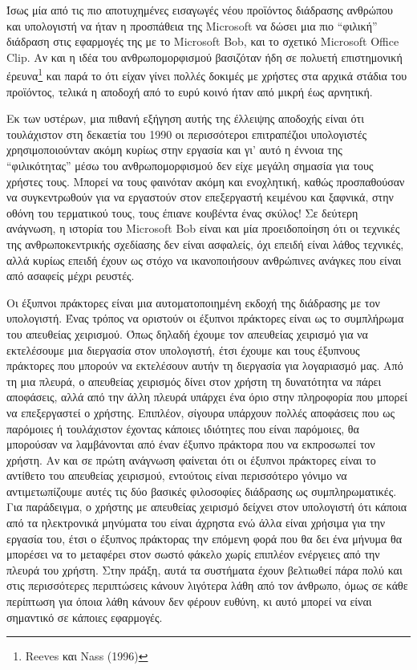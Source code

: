 \documentclass[
]{article}
\begin{document}
Ίσως μία από τις πιο αποτυχημένες εισαγωγές νέου προϊόντος διάδρασης
ανθρώπου και υπολογιστή να ήταν η προσπάθεια της Microsoft να δώσει μια
πιο ``φιλική'' διάδραση στις εφαρμογές της με το Microsoft Bob, και το
σχετικό Microsoft Office Clip. Αν και η ιδέα του ανθρωπομορφισμού
βασιζόταν ήδη σε πολυετή επιστημονική έρευνα\footnote{Reeves και Nass
  (1996)} και παρά το ότι είχαν γίνει πολλές δοκιμές με χρήστες στα
αρχικά στάδια του προϊόντος, τελικά η αποδοχή από το ευρύ κοινό ήταν από
μικρή έως αρνητική.

Εκ των υστέρων, μια πιθανή εξήγηση αυτής της έλλειψης αποδοχής είναι ότι
τουλάχιστον στη δεκαετία του 1990 οι περισσότεροι επιτραπέζιοι
υπολογιστές χρησιμοποιούνταν ακόμη κυρίως στην εργασία και γι' αυτό η
έννοια της ``φιλικότητας'' μέσω του ανθρωπομορφισμού δεν είχε μεγάλη
σημασία για τους χρήστες τους. Μπορεί να τους φαινόταν ακόμη και
ενοχλητική, καθώς προσπαθούσαν να συγκεντρωθούν για να εργαστούν στον
επεξεργαστή κειμένου και ξαφνικά, στην οθόνη του τερματικού τους, τους
έπιανε κουβέντα ένας σκύλος! Σε δεύτερη ανάγνωση, η ιστορία του
Microsoft Bob είναι και μία προειδοποίηση ότι οι τεχνικές της
ανθρωποκεντρικής σχεδίασης δεν είναι ασφαλείς, όχι επειδή είναι λάθος
τεχνικές, αλλά κυρίως επειδή έχουν ως στόχο να ικανοποιήσουν ανθρώπινες
ανάγκες που είναι από ασαφείς μέχρι ρευστές.

Οι έξυπνοι πράκτορες είναι μια αυτοματοποιημένη εκδοχή της διάδρασης με
τον υπολογιστή. Ένας τρόπος να οριστούν οι έξυπνοι πράκτορες είναι ως το
συμπλήρωμα του απευθείας χειρισμού. Όπως δηλαδή έχουμε τον απευθείας
χειρισμό για να εκτελέσουμε μια διεργασία στον υπολογιστή, έτσι έχουμε
και τους έξυπνους πράκτορες που μπορούν να εκτελέσουν αυτήν τη διεργασία
για λογαριασμό μας. Από τη μια πλευρά, ο απευθείας χειρισμός δίνει στον
χρήστη τη δυνατότητα να πάρει αποφάσεις, αλλά από την άλλη πλευρά
υπάρχει ένα όριο στην πληροφορία που μπορεί να επεξεργαστεί ο χρήστης.
Επιπλέον, σίγουρα υπάρχουν πολλές αποφάσεις που ως παρόμοιες ή
τουλάχιστον έχοντας κάποιες ιδιότητες που είναι παρόμοιες, θα μπορούσαν
να λαμβάνονται από έναν έξυπνο πράκτορα που να εκπροσωπεί τον χρήστη. Αν
και σε πρώτη ανάγνωση φαίνεται ότι οι έξυπνοι πράκτορες είναι το
αντίθετο του απευθείας χειρισμού, εντούτοις είναι περισσότερο γόνιμο να
αντιμετωπίζουμε αυτές τις δύο βασικές φιλοσοφίες διάδρασης ως
συμπληρωματικές. Για παράδειγμα, ο χρήστης με απευθείας χειρισμό δείχνει
στον υπολογιστή ότι κάποια από τα ηλεκτρονικά μηνύματα του είναι άχρηστα
ενώ άλλα είναι χρήσιμα για την εργασία του, έτσι ο έξυπνος πράκτορας την
επόμενη φορά που θα δει ένα μήνυμα θα μπορέσει να το μεταφέρει στον
σωστό φάκελο χωρίς επιπλέον ενέργειες από την πλευρά του χρήστη. Στην
πράξη, αυτά τα συστήματα έχουν βελτιωθεί πάρα πολύ και στις περισσότερες
περιπτώσεις κάνουν λιγότερα λάθη από τον άνθρωπο, όμως σε κάθε περίπτωση
για όποια λάθη κάνουν δεν φέρουν ευθύνη, κι αυτό μπορεί να είναι
σημαντικό σε κάποιες εφαρμογές.
\end{document}
